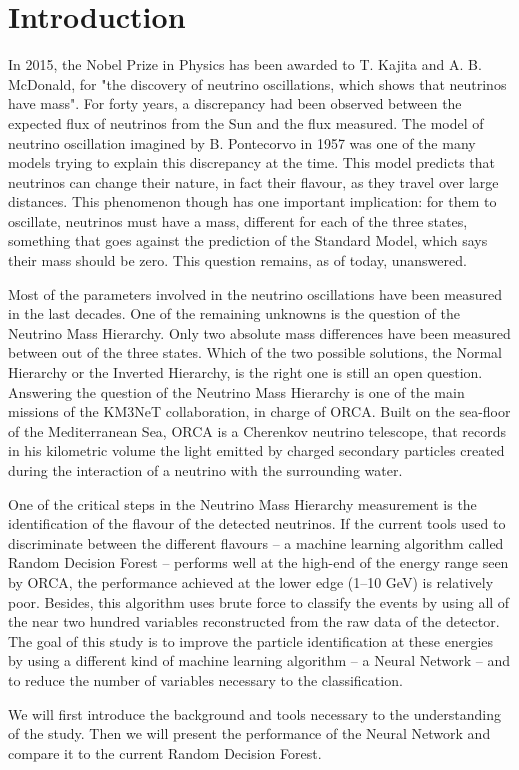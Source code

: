 \chapter*{Introduction}




In 2015, the Nobel Prize in Physics has been awarded to T. Kajita and A. B. McDonald, for "the discovery of neutrino oscillations, which shows that neutrinos have mass". For forty years, a discrepancy had been observed between the expected flux of neutrinos from the Sun and the flux measured. The model of neutrino oscillation imagined by B. Pontecorvo in 1957 was one of the many models trying to explain this discrepancy at the time. This model predicts that neutrinos can change their nature, in fact their flavour, as they travel over large distances. This phenomenon though has one important implication: for them to oscillate, neutrinos must have a mass, different for each of the three states, something that goes against the prediction of the Standard Model, which says their mass should be zero. This question remains, as of today, unanswered.

Most of the parameters involved in the neutrino oscillations have been measured in the last decades. One of the remaining unknowns is the question of the Neutrino Mass Hierarchy. Only two absolute mass differences have been measured between out of the three states. Which of the two possible solutions, the Normal Hierarchy or the Inverted Hierarchy, is the right one is still an open question. Answering the question of the Neutrino Mass Hierarchy is one of the main missions of the KM3NeT collaboration, in charge of ORCA. Built on the sea-floor of the Mediterranean Sea, ORCA is a Cherenkov neutrino telescope, that records in his kilometric volume the light emitted by charged secondary particles created during the interaction of a neutrino with the surrounding water. 

One of the critical steps in the Neutrino Mass Hierarchy measurement is the identification of the flavour of the detected neutrinos. If the current tools used to discriminate between the different flavours -- a machine learning algorithm called Random Decision Forest -- performs well at the high-end of the energy range seen by ORCA, the performance achieved at the lower edge (1--10 GeV) is relatively poor. Besides, this algorithm uses brute force to classify the events by using all of the near two hundred variables reconstructed from the raw data of the detector. The goal of this study is to improve the particle identification at these energies by using a different kind of machine learning algorithm -- a Neural Network -- and to reduce the number of variables necessary to the classification.

We will first introduce the background and tools necessary to the understanding of the study. Then we will present the performance of the Neural Network and compare it to the current Random Decision Forest.

